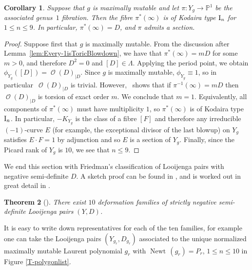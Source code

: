 \documentclass[pdftex]{sigma}
\numberwithin{equation}{section}
\newtheorem{Theorem}{Theorem}[section]
\newtheorem{Corollary}[Theorem]{Corollary}
\DeclareMathOperator{\Newt}{{Newt \,}}
\DeclareMathOperator{\cO}{\mathcal{O}}
\newcommand{\PP}{\mathbb{P}}
\begin{document}
	\begin{Corollary}\label{prop:m=1}
		Suppose that $g$ is maximally mutable and let $\pi \colon Y_g \rightarrow \PP^1$ be the associated genus~$1$ fibration. Then the fibre $\pi^*(\infty)$ is of Kodaira type ${\rm I}_n$ for $1 \leq n \leq 9$. In particular, $\pi^*(\infty)=D$, and $\pi$ admits a section.
	\end{Corollary}
	
	\begin{proof}
		Suppose first that $g$ is maximally mutable. From the discussion after Lemma~\ref{lem:Every-1isToricBlowdown}, we have that $\pi^*(\infty)=mD$ for some $m>0$, and therefore $D^2=0$ and $[D] \in \Lambda$.
		Applying the period point, we obtain
$
		\phi_{Y_g}([D])=\cO(D)_{|D}$.
		Since $g$ is maximally mutable, $\phi_{Y_g} \equiv 1$, so in particular~$\cO(D)_{|D}$ is trivial.
		However,~\cite[{\rm III}, Lemma 8.3]{BarthPetersVandeVen} shows that if $\pi^{-1}(\infty)=mD$ then~$\cO(D)_{|D}$ is torsion of exact order $m$. We conclude that $m=1$. Equivalently, all components of $\pi^*(\infty)$ must have multiplicity $1$, so $\pi^*(\infty)$ is of Kodaira type ${\rm I}_n$.
		In particular, $-K_{Y_g}$ is the class of a fibre $[F]$ and therefore any irreducible $(-1)$-curve $E$ (for example, the exceptional divisor of the last blowup) on $Y_g$ satisfies $E \cdot F=1$ by adjunction and so $E$ is a section of $Y_g$. Finally, since the Picard rank of $Y_g$ is $10$, we see that $n \leq 9$.
	\end{proof}

	We end this section with Friedman's classification of Looijenga pairs with negative semi-definite $D$. A sketch proof can be found in \cite[Theorems 9.15 and~9.16]{Friedman}, and is worked out in great detail in \cite{LutzThesis}.

	\begin{Theorem}[\cite{Friedman}]\label{thm:10deformationfamilies}
	There exist $10$ deformation families of strictly negative semi-definite Looijenga pairs $(Y, D)$.
\end{Theorem}

	It is easy to write down representatives for each of the ten families, for example one can take the Looijenga pairs $(Y_{g_r}, D_{g_r})$ associated to the unique normalized maximally mutable Laurent polynomial $g_r$ with $\Newt(g_r)=P_r$, $1 \leq n \leq 10$ in Figure \ref{T-polygonlist}.
\end{document}
